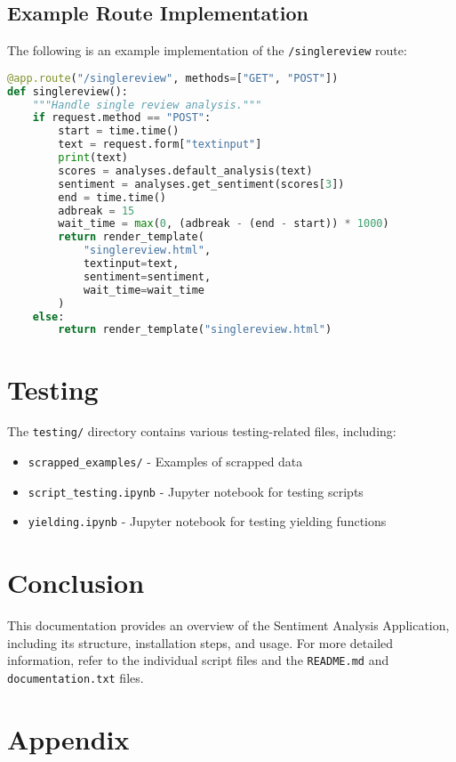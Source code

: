 \documentclass[a4paper]{article}
\begin{document}
\subsection{Example Route Implementation}
The following is an example implementation of the \texttt{/singlereview} route:
\begin{lstlisting}[language=python]
@app.route("/singlereview", methods=["GET", "POST"])
def singlereview():
    """Handle single review analysis."""
    if request.method == "POST":
        start = time.time()
        text = request.form["textinput"]
        print(text)
        scores = analyses.default_analysis(text)
        sentiment = analyses.get_sentiment(scores[3])
        end = time.time()
        adbreak = 15
        wait_time = max(0, (adbreak - (end - start)) * 1000)
        return render_template(
            "singlereview.html", 
            textinput=text, 
            sentiment=sentiment, 
            wait_time=wait_time
        )
    else:
        return render_template("singlereview.html")
\end{lstlisting}

\section{Testing}
The \texttt{testing/} directory contains various testing-related files, including:
\begin{itemize}
    \item \texttt{scrapped\_examples/} - Examples of scrapped data
    \item \texttt{script\_testing.ipynb} - Jupyter notebook for testing scripts
    \item \texttt{yielding.ipynb} - Jupyter notebook for testing yielding functions
\end{itemize}

\section{Conclusion}
This documentation provides an overview of the Sentiment Analysis Application, including its structure, installation steps, and usage. For more detailed information, refer to the individual script files and the \texttt{README.md} and \texttt{documentation.txt} files.

\section{Appendix}
\end{document}
